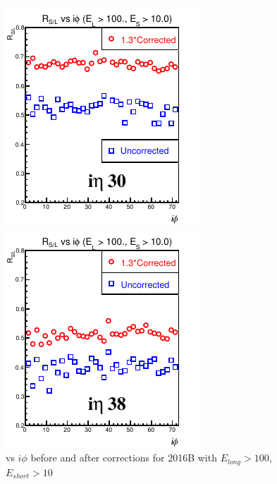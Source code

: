 \begin{figure}[!h] %
\begin{minipage}[c]{0.5\linewidth}
\centering
\includegraphics[width=0.7\linewidth]{../Figures/Chap2/ImageFiles_HF/Ratio/2016/Corrected/EnergyCut10010/ieta30Ecut4CorrectionEcut3.pdf}
\end{minipage}
\begin{minipage}[c]{0.5\linewidth}
\centering
\includegraphics[width=0.7\linewidth]{../Figures/Chap2/ImageFiles_HF/Ratio/2016/Corrected/EnergyCut10010/ieta38Ecut4CorrectionEcut3.pdf}
\end{minipage}
\caption[\ratiosl vs $i\phi$ with $E_{long} > 100$, $E_{short} >10$]{\ratiosl vs $i\phi$ before and after corrections for 2016B with $E_{long} > 100$, $E_{short} >10$}
\label{Ecut4CorrectionEcut3}
\end{figure}

